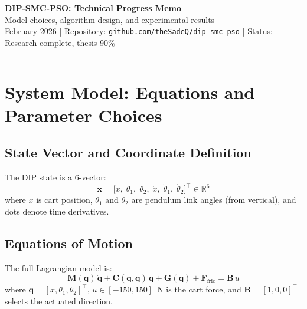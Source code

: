 \documentclass[11pt, a4paper]{article}
\newcommand{\vx}{\boldsymbol{x}}
\newcommand{\vq}{\boldsymbol{q}}
\newcommand{\Mq}{\mathbf{M}(\vq)}
\newcommand{\Cq}{\mathbf{C}(\vq,\dot{\vq})}
\newcommand{\Gq}{\mathbf{G}(\vq)}
\newcommand{\R}{\mathbb{R}}
\begin{document}

\begin{center}
  {\LARGE\bfseries\color{headblue}
    DIP-SMC-PSO: Technical Progress Memo}\\[0.4em]
  {\large Model choices, algorithm design, and experimental results}\\[0.2em]
  {\small February 2026 \quad|\quad
    Repository: \texttt{github.com/theSadeQ/dip-smc-pso} \quad|\quad
    Status: Research complete, thesis 90\%}
\end{center}
\vspace{-0.5em}
\noindent\textcolor{headblue}{\rule{\linewidth}{1pt}}
\vspace{0.5em}

\tableofcontents
\newpage

\section{System Model: Equations and Parameter Choices}

\subsection{State Vector and Coordinate Definition}

The DIP state is a 6-vector:
\begin{equation}
  \vx = \bigl[x,\; \theta_1,\; \theta_2,\; \dot{x},\; \dot{\theta}_1,\;
              \dot{\theta}_2\bigr]^\top \in \R^6
  \label{eq:state}
\end{equation}
where $x$ is cart position, $\theta_1$ and $\theta_2$ are pendulum link angles
(from vertical), and dots denote time derivatives.

\subsection{Equations of Motion}

The full Lagrangian model is:
\begin{equation}
  \Mq\,\ddot{\vq} + \Cq\,\dot{\vq} + \Gq + \bm{F}_\text{fric}
    = \bm{B}\,u
  \label{eq:eom}
\end{equation}
where $\vq = [x, \theta_1, \theta_2]^\top$, $u \in [-150, 150]$~N
is the cart force, and $\bm{B} = [1, 0, 0]^\top$ selects the actuated direction.
\end{document}
